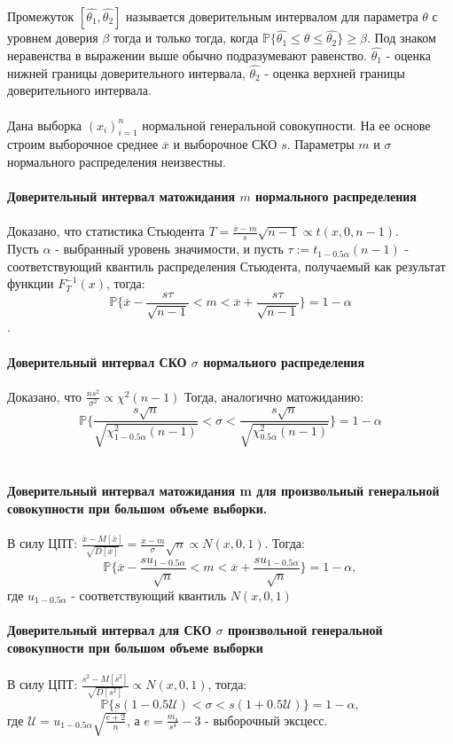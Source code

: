 \documentclass[14pt]{extarticle}
\begin{document}
Промежуток \([\widehat{\theta_1}, \widehat{\theta_2}]\) называется доверительным интервалом для параметра \(\theta\) с уровнем доверия \(\beta\) тогда и только тогда, когда \(\mathbb{P}\{\widehat{\theta_1}\leq\theta\leq\widehat{\theta_2}\}\geq\beta\). Под знаком неравенства в выражении выше обычно подразумевают равенство. \(\widehat{\theta_1}\) - оценка нижней границы доверительного интервала, \(\widehat{\theta_2}\) - оценка верхней границы доверительного интервала.\\\\
Дана выборка \((x_i)_{i=1}^n\) нормальной генеральной совокупности. На ее основе строим выборочное среднее \(\overline{x}\) и выборочное СКО \(s\). Параметры \(m\) и \(\sigma\) нормального распределения неизвестны.\\\\
\textbf{Доверительный интервал матожидания \(m\) нормального распределения}\\\\
Доказано, что статистика Стьюдента \(T=\frac{\overline{x}-m}{s}\sqrt{n-1}\propto t(x, 0, n-1)\).\\
Пусть \(\alpha\) - выбранный уровень значимости, и пусть \(\tau:=t_{1-0.5\alpha}(n-1)\) - соответствующий квантиль распределения Стьюдента, получаемый как результат функции \(F_T^{-1}(x)\), тогда:\\
\[\mathbb{P}\{\overline{x}-\frac{s\tau}{\sqrt{n-1}}<m<\overline{x}+\frac{s\tau}{\sqrt{n-1}}\}=1-\alpha\].\\\\
\textbf{Доверительный интервал СКО \(\sigma\) нормального распределения}\\\\
Доказано, что \(\frac{ns^2}{\sigma^2}\propto\chi^2(n-1)\)
Тогда, аналогично матожиданию:
\[\mathbb{P}\{\frac{s\sqrt{n}}{\sqrt{\chi_{1-0.5\alpha}^2(n-1)}}<\sigma<\frac{s\sqrt{n}}{\sqrt{\chi_{0.5\alpha}^2(n-1)}}\}=1-\alpha\]\\\\
\textbf{Доверительный интервал матожидания m для произвольный генеральной совокупности при большом объеме выборки.}\\\\
В силу ЦПТ:  \(\frac{\overline{x}-M[\overline{x}]}{\sqrt{D[\overline{x}]}}=\frac{\overline{x}-m}{\sigma}\sqrt{n}\propto N(x, 0, 1)\). Тогда:
\[\mathbb{P}\{\overline{x}-\frac{su_{1-0.5\alpha}}{\sqrt{n}}<m<\overline{x}+\frac{su_{1-0.5\alpha}}{\sqrt{n}}\}=1-\alpha,\]
где \(u_{1-0.5\alpha}\) - соответствующий квантиль \(N(x, 0, 1)\)\\\\
\textbf{Доверительный интервал для СКО \(\sigma\) произвольной генеральной совокупности при большом объеме выборки}\\\\
В силу ЦПТ:  \(\frac{s^2-M[s^2]}{\sqrt{D[s^2]}}\propto N(x, 0, 1)\), тогда:
\[\mathbb{P}\{s(1-0.5\mathcal{U})<\sigma<s(1+0.5\mathcal{U})\}=1-\alpha,\]
где \(\mathcal{U}=u_{1-0.5\alpha}\sqrt{\frac{e+2}{n}}\), а \(e=\frac{m_4}{s^4}-3\) - выборочный эксцесс.
\end{document}
